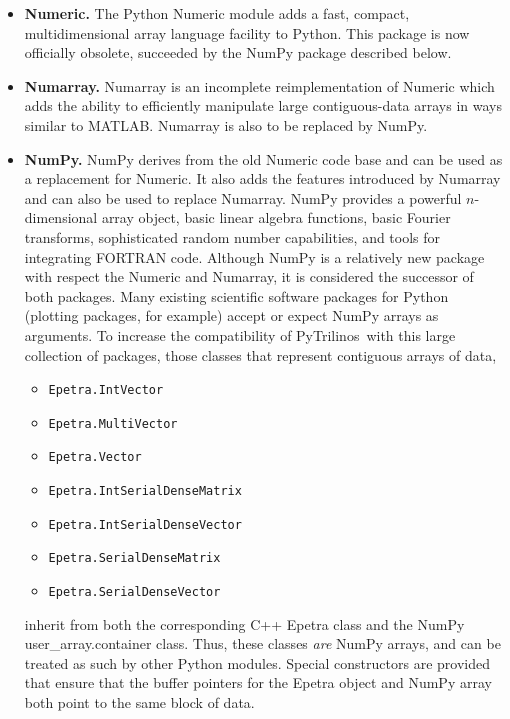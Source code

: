 \documentclass[acmtocl]{acmtrans2m}
\newcommand{\PyTrilinos}{{PyTrilinos}}
\begin{document}
\begin{itemize}

\item {\bf Numeric.} The Python Numeric module adds a fast, compact,
  multidimensional array language facility to Python.  This package is
  now officially obsolete, succeeded by the NumPy package described
  below.

\item {\bf Numarray.}  Numarray is an incomplete reimplementation of
  Numeric which adds the ability to efficiently manipulate large
  contiguous-data arrays in ways similar to MATLAB.  Numarray is also
  to be replaced by NumPy.

\item {\bf NumPy.} NumPy derives from the old Numeric code base and
  can be used as a replacement for Numeric.  It also adds the features
  introduced by Numarray and can also be used to replace Numarray.
  NumPy provides a powerful $n$-dimensional array object, basic linear
  algebra functions, basic Fourier transforms, sophisticated random
  number capabilities, and tools for integrating FORTRAN
  code. Although NumPy is a relatively new package with respect the
  Numeric and Numarray, it is considered the successor of both
  packages.  Many existing scientific software packages for Python
  (plotting packages, for example) accept or expect NumPy arrays as
  arguments.  To increase the compatibility of \PyTrilinos\ with this
  large collection of packages, those classes that represent
  contiguous arrays of data,

  \begin{itemize}
    \item {\tt Epetra.IntVector}
    \item {\tt Epetra.MultiVector}
    \item {\tt Epetra.Vector}
    \item {\tt Epetra.IntSerialDenseMatrix}
    \item {\tt Epetra.IntSerialDenseVector}
    \item {\tt Epetra.SerialDenseMatrix}
    \item {\tt Epetra.SerialDenseVector}
  \end{itemize}

  inherit from both the corresponding C++ Epetra class and the NumPy
  user\_array.container class.  Thus, these classes {\sl are} NumPy
  arrays, and can be treated as such by other Python modules.  Special
  constructors are provided that ensure that the buffer pointers for
  the Epetra object and NumPy array both point to the same block of
  data.


\end{itemize}
\end{document}
